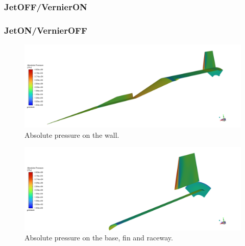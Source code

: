 \documentclass[12pt]{article}
\begin{document}
\subsubsection{JetOFF/VernierON}

\subsubsection{JetON/VernierOFF}

\begin{figure}[H]
    \centering
    \includegraphics[width=\linewidth]{figs/t65s/Pabs_wall.png}
    \caption{Absolute pressure on the wall.}
    \label{fig:t65s_wall_pabs}
\end{figure}
\begin{figure}[H]
    \centering
    \includegraphics[width=\linewidth]{figs/t65s/Pabs_base_fin_raceway.png}
    \caption{Absolute pressure on the base, fin and raceway.}
    \label{fig:t65s_base_fin_raceway_pabs}
\end{figure}
\end{document}
